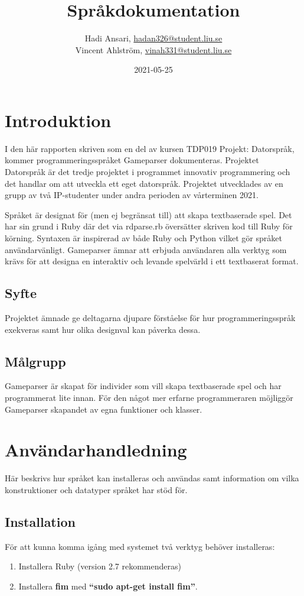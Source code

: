 \documentclass{Dokumentmall}
\author{Hadi Ansari, \url{hadan326@student.liu.se}\\
  Vincent Ahlström, \url{vinah331@student.liu.se}}
\title{Språkdokumentation}
\date{2021-05-25}
\begin{document}
\projectpage
\tableofcontents
{}
\thispagestyle{empty}
\cleardoublepage
\setcounter{page}{1}
\section{Introduktion}
I den här rapporten skriven som en del av kursen TDP019 Projekt: Datorspråk, kommer programmeringsspråket Gameparser dokumenteras. Projektet Datorspråk är det tredje projektet i programmet innovativ programmering och det handlar om att utveckla ett eget datorspråk. Projektet utvecklades av en grupp av två IP-studenter under andra perioden av vårterminen 2021.

Språket är designat för (men ej begränsat till) att skapa textbaserade spel. Det har sin grund i Ruby där det via rdparse.rb översätter skriven kod till Ruby för körning. Syntaxen är inspirerad av både Ruby och Python vilket gör språket användarvänligt. Gameparser ämnar att erbjuda användaren alla verktyg som krävs för att designa en interaktiv och levande spelvärld i ett textbaserat format.

\subsection{Syfte}
Projektet ämnade ge deltagarna djupare förståelse för hur programmeringsspråk exekveras samt hur olika designval kan påverka dessa.

\subsection{Målgrupp}
Gameparser är skapat för individer som vill skapa textbaserade spel och har programmerat lite innan. För den något mer erfarne programmeraren möjliggör Gameparser skapandet av egna funktioner och klasser.

\newpage
\section{Användarhandledning}
Här beskrivs hur språket kan installeras och användas samt information om vilka konstruktioner och  datatyper språket har stöd för.

\subsection{Installation}
För att kunna komma igång med systemet två verktyg behöver installeras:
\begin{enumerate}  
\item Installera Ruby (version 2.7 rekommenderas)
\item Installera \textbf{fim} med \textbf{``sudo apt-get install fim''}.
\end{enumerate}
\end{document}
